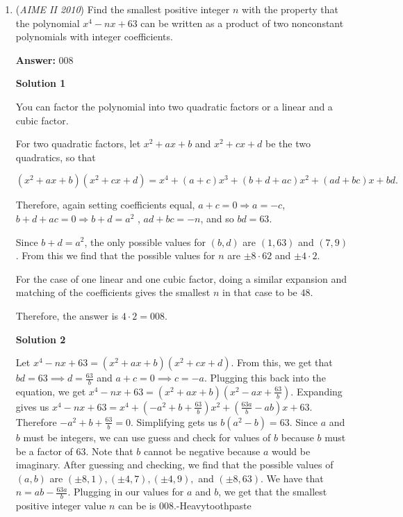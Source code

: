 \begin{enumerate}
 An easier approach from  $a+b+c=81$ and $a(b+c)+bc=ab+ac+bc=468$ would be just squaring $a+b+c=81$.~SwordAxe

 


	\item (\textit{AIME II 2010}) Find the smallest positive integer $n$ with the property that the polynomial $x^4 - nx + 63$ can be written as a product of two nonconstant polynomials with integer coefficients.


 
 \textbf{Answer: }008



\textbf{Solution 1}

You can factor the polynomial into two quadratic factors or a linear and a cubic factor.

 For two quadratic factors, let $x^2+ax+b$ and $x^2+cx+d$ be the two quadratics, so that

 
 \[(x^2 + ax + b )(x^2 + cx + d) = x^4 + (a + c)x^3 + (b + d + ac)x^2 + (ad + bc)x + bd.\]

 Therefore, again setting coefficients equal, $a + c = 0\Longrightarrow a=-c$, $b + d + ac = 0\Longrightarrow b+d=a^2$ , $ad + bc = - n$, and so $bd = 63$.

 Since $b+d=a^2$, the only possible values for $(b,d)$ are $(1,63)$ and $(7,9)$. From this we find that the possible values for $n$ are $\pm 8 \cdot 62$ and $\pm 4 \cdot 2$. 

 For the case of one linear and one cubic factor, doing a similar expansion and matching of the coefficients gives the smallest $n$ in that case to be $48$. 

 Therefore, the answer is $4 \cdot 2 = \boxed{008}$.

 



\textbf{Solution 2}

Let $x^4-nx+63=(x^2+ax+b)(x^2+cx+d)$. From this, we get that $bd=63\implies d=\frac{63}{b}$ and $a+c=0\implies c=-a$. Plugging this back into the equation, we get $x^4-nx+63=(x^2+ax+b)\left(x^2-ax+\frac{63}{b}\right)$. Expanding gives us $x^4-nx+63=x^4+\left(-a^2+b+\frac{63}{b}\right)x^2+\left(\frac{63a}{b}-ab\right)x+63$. Therefore $-a^2+b+\frac{63}{b}=0$. Simplifying gets us $b(a^2-b)=63$. Since $a$ and $b$ must be integers, we can use guess and check for values of $b$ because $b$ must be a factor of $63$. Note that $b$ cannot be negative because $a$ would be imaginary. After guessing and checking, we find that the possible values of $(a,b)$ are $(\pm 8, 1), (\pm 4, 7), (\pm 4, 9),$ and $(\pm 8, 63)$. We have that $n=ab-\frac{63a}{b}$. Plugging in our values for $a$ and $b$, we get that the smallest positive integer value $n$ can be is $\boxed{008}$.-Heavytoothpaste


\end{enumerate}
